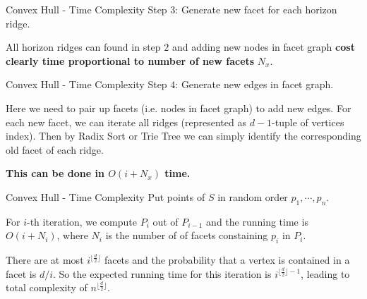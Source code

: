 \documentclass{beamer}
\begin{document}
\begin{frame}{Convex Hull - Time Complexity}
	Step $3$: Generate new facet for each horizon ridge.

	\vspace{\baselineskip}

	All horizon ridges can found in step $2$ and adding new nodes in facet graph
	\textbf{cost clearly time proportional to number of new facets} $N_x$.
\end{frame}
\begin{frame}{Convex Hull - Time Complexity}
	Step $4$: Generate new edges in facet graph.

	\vspace{\baselineskip}

	Here we need to pair up facets (i.e. nodes in facet graph) to add new edges.
	For each new facet, we can iterate all ridges (represented as $d-1$-tuple of vertices index).
	Then by Radix Sort or Trie Tree we can simply identify the corresponding old facet of each ridge.

	\vspace{\baselineskip}

	\textbf{This can be done in $O(i + N_x)$ time.}
\end{frame}
\begin{frame}{Convex Hull - Time Complexity}
Put points of $S$ in random order $p_1, \cdots, p_n$.

\vspace{\baselineskip}

For $i$-th iteration, we compute $P_i$ out of $P_{i-1}$ and the running time is $O(i + N_i)$, where $N_i$ is the number of 
of facets constaining $p_i$ in $P_i$.

\vspace{\baselineskip}

There are at most $i^{\lfloor \frac{d}{2} \rfloor}$ facets and the probability that a vertex is contained in a facet 
is $d / i$. So the expected running time for this iteration is $i^{\lfloor \frac{d}{2} \rfloor - 1}$, leading to total complexity of $n^{\lfloor \frac{d}{2} \rfloor }$.
\end{frame}
\end{document}
